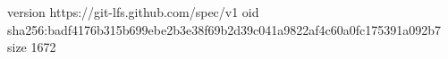 version https://git-lfs.github.com/spec/v1
oid sha256:badf4176b315b699ebe2b3e38f69b2d39c041a9822af4c60a0fc175391a092b7
size 1672
